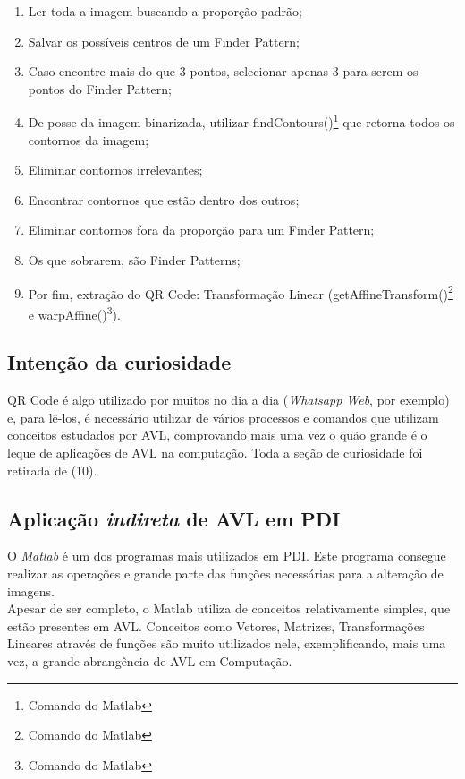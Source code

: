 \documentclass{article}
\begin{document}
                \begin{enumerate}
                
                \item Ler toda a imagem buscando a proporção padrão;
                
                \item Salvar os possíveis centros de um Finder Pattern;
                
                \item Caso encontre mais do que 3 pontos, selecionar apenas 3 para serem os pontos do Finder Pattern;
                
                \item De posse da imagem binarizada, utilizar findContours()\footnote{Comando do Matlab} que retorna todos os contornos da imagem;
                
                \item Eliminar contornos irrelevantes;
                
                \item Encontrar contornos que estão dentro dos outros;
                
                \item Eliminar contornos fora da proporção para um Finder Pattern;
                
                \item Os que sobrarem, são Finder Patterns;
                
                \item Por fim, extração do QR Code: Transformação Linear (getAffineTransform()\footnote{Comando do Matlab} e warpAffine()\footnote{Comando do Matlab}).
                
                \end{enumerate}
                
            \subsection{Intenção da curiosidade}
            QR Code é algo utilizado por muitos no dia a dia ({\it Whatsapp Web}, por exemplo) e, para lê-los, é necessário utilizar de vários processos e comandos que utilizam conceitos estudados por AVL, comprovando mais uma vez o quão grande é o leque de aplicações de AVL na computação. Toda a seção de curiosidade foi retirada de (10).
            
            \subsection{Aplicação {\it indireta} de AVL em PDI}
        O {\it Matlab} é um dos programas mais utilizados em PDI. Este programa consegue realizar as operações e grande parte das funções necessárias para a alteração de imagens.\\
        Apesar de ser completo, o Matlab utiliza de conceitos relativamente simples, que estão presentes em AVL. Conceitos como Vetores, Matrizes, Transformações Lineares através de funções são muito utilizados nele, exemplificando, mais uma vez, a grande abrangência de AVL em Computação.
         
\end{document}
